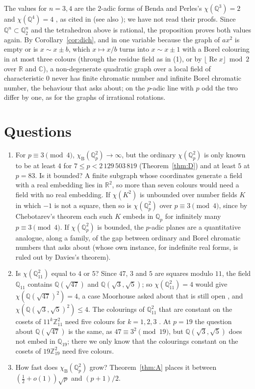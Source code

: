 \documentclass[11pt,a4paper]{amsart}
\theoremstyle{remark}
\newcommand{\Q}{\mathbb{Q}}
\newcommand{\R}{\mathbb{R}}
\newcommand{\Z}{\mathbb{Z}}
\newcommand{\C}{\mathbb{C}}
\newcommand{\chiB}{\chi_{\mathrm{B}}}
\begin{document}
The values for $n=3,4$ are the $2$-adic forms of Benda and Perles's $\chi(\Q^3)=2$ and $\chi(\Q^4)=4$ \cite{BP},
as cited in \cite[\P1.6]{Madore} (see also \cite[\S\S11.3--11.4]{Soifer}); we have not read their proofs. Since
$\Q^n\subset\Q_2^n$ and the tetrahedron above is rational, the proposition proves both values again. By
Corollary~\ref{cor:dich}, and in one variable because the graph of $ax^2$ is empty or is $x\sim x\pm b$, which
$x\mapsto x/b$ turns into $x\sim x\pm1$ with a Borel colouring in at most three colours (through the residue field
as in (1), or by $\lfloor\operatorname{Re}x\rfloor\bmod2$ over $\R$ and $\C$), a non-degenerate quadratic graph over
a local field of characteristic $0$ never has finite chromatic number and infinite Borel chromatic number, the
behaviour that \cite[Remark~1.3]{BMK} asks about; on the $p$-adic line with $p$ odd the two differ by one, as for
the graphs of irrational rotations.

\section{Questions}

\begin{enumerate}
\item For $p\equiv3\pmod4$, $\chiB(\Q_p^2)\to\infty$, but the ordinary $\chi(\Q_p^2)$ is only known to be at
least $4$ for $7\le p<2\,129\,503\,819$ (Theorem~\ref{thm:D}) and at least $5$ at $p=83$. Is it bounded? A finite
subgraph whose coordinates generate a field with a real embedding lies in $\R^2$, so more than seven colours would
need a field with no real embedding. If $\chi(K^2)$ is unbounded over number fields $K$ in which $-1$ is not a
square, then so is $\chi(\Q_p^2)$ over $p\equiv3\pmod4$, since by Chebotarev's theorem each such $K$ embeds in
$\Q_p$ for infinitely many $p\equiv3\pmod4$. If $\chi(\Q_p^2)$ is bounded, the $p$-adic planes are a quantitative
analogue, along a family, of the gap between ordinary and Borel chromatic numbers that \cite[Remark~1.3]{BMK}
asks about (whose own instance, for indefinite real forms, is ruled out by Davies's theorem).
\item Is $\chi(\Q_{11}^2)$ equal to $4$ or $5$? Since $47$, $3$ and $5$ are squares modulo $11$, the field
$\Q_{11}$ contains $\Q(\sqrt{47})$ and $\Q(\sqrt3,\sqrt5)$; so $\chi(\Q_{11}^2)=4$ would give
$\chi(\Q(\sqrt{47})^2)=4$, a case Moorhouse asked about \cite{MoorhouseTalk} that is still open \cite{QP}, and
$\chi(\Q(\sqrt3,\sqrt5)^2)\le4$. The colourings of $\Q_{11}^2$ that are constant on the cosets of $11^k\Z_{11}^2$
need five colours for $k=1,2,3$ \cite{Repo}. At $p=19$ the question about $\Q(\sqrt{47})$ is the same, as
$47\equiv3^2\pmod{19}$, but $\Q(\sqrt3,\sqrt5)$ does not embed in $\Q_{19}$; there we only know that the
colourings constant on the cosets of $19\Z_{19}^2$ need five colours.
\item How fast does $\chiB(\Q_p^2)$ grow? Theorem~\ref{thm:A} places it between $(\frac12+o(1))\sqrt p$ and
$(p+1)/2$.
\end{enumerate}
\end{document}

